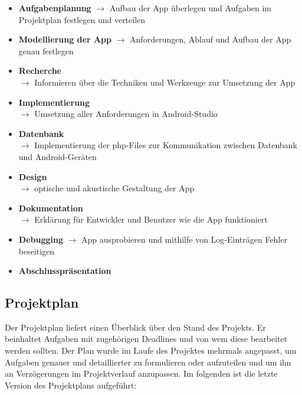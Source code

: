 \documentclass[12pt, a4paper]{article}
\begin{document}
\begin{itemize}

\item \textbf{Aufgabenplanung}   
$\rightarrow$ Aufbau der App überlegen und Aufgaben im Projektplan festlegen und verteilen

\item \textbf{Modellierung der App} 
$\rightarrow$ Anforderungen, Ablauf und Aufbau der App genau festlegen

\item \textbf{Recherche} \\
$\rightarrow$ Informieren über die Techniken und Werkzeuge zur Umsetzung der App

\item \textbf{Implementierung} \\
$\rightarrow$ Umsetzung aller Anforderungen in Android-Studio

\item \textbf{Datenbank} \\
$\rightarrow$ Implementierung der php-Files zur Kommunikation zwischen Datenbank und Android-Geräten

\item \textbf{Design} \\
$\rightarrow$ optische und akustische Gestaltung der App

\item \textbf{Dokumentation} \\
$\rightarrow$ Erklärung für Entwickler und Benutzer wie die App funktioniert

\item \textbf{Debugging} 
$\rightarrow$ App ausprobieren und mithilfe von Log-Einträgen Fehler beseitigen

\item \textbf{Abschlusspräsentation} 

\end{itemize}
		

	\subsection{Projektplan}

Der Projektplan liefert einen Überblick über den Stand des Projekts. Er beinhaltet Aufgaben mit zugehörigen Deadlines und von wem diese bearbeitet werden sollten. Der Plan wurde im Laufe des Projektes mehrmals angepasst, um Aufgaben genauer und detaillierter zu formulieren oder aufzuteilen und um ihn an Verzögerungen im Projektverlauf anzupassen. Im folgenden ist die letzte Version des Projektplans aufgeführt: 
\end{document}
